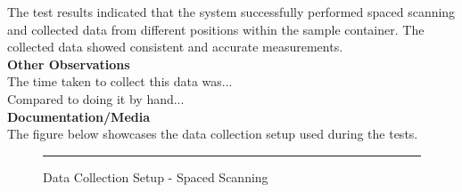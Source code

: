 \documentclass{UoNMCHA}
\numberwithin{equation}{section}
\begin{document}
The test results indicated that the system successfully performed spaced scanning and collected data from different positions within the sample container. The collected data showed consistent and accurate measurements.\\

\textbf{Other Observations}\\

The time taken to collect this data was...\\

Compared to doing it by hand...\\

\textbf{Documentation/Media}\\

The figure below showcases the data collection setup used during the tests.\\

\begin{figure}[h]
	\centering
	\rule{0.5\textwidth}{0.5\textwidth}%
	\caption{Data Collection Setup - Spaced Scanning}
	\label{fig:Data Collection Setup - Spaced Scanning}
\end{figure}
\end{document}
